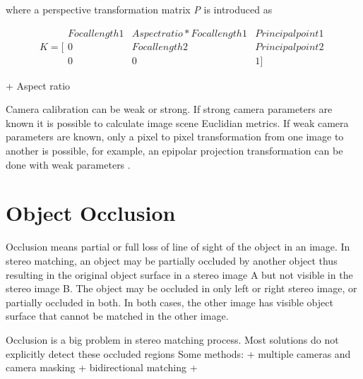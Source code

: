 \documentclass[12pt,a4paper,oneside,pdftex]{report}
\begin{document}
where a perspective transformation matrix \emph{P} is introduced as



\begin{equation} K =
\Biggl[ \begin{array}{ccc}
Focal length 1 & Aspect ratio * Focal length 1 & Principal point 1 \\
0 & Focal length 2 & Principal point 2 \\
0 & 0 & 1 \Biggl] \end{array}
\end{equation}

+ Aspect ratio


Camera calibration can be weak or strong. If strong camera parameters are known it is possible to calculate image scene Euclidian metrics. If weak camera parameters are known, only a pixel to pixel transformation from one image to another is possible, for example, an epipolar projection transformation can be done with weak parameters \cite{Rander97}.


\section{Object Occlusion}

Occlusion means partial or full loss of line of sight of the object in an image. In stereo matching, an object may be partially occluded by another object thus resulting in the original object surface in a stereo image A but not visible in the stereo image B. The object may be occluded in only left or right stereo image, or partially occluded in both. In both cases, the other image has visible object surface that cannot be matched in the other image.

Occlusion is a big problem in stereo matching process. Most solutions do not explicitly detect these occluded regions 
Some methods:
+ multiple cameras and camera masking
+ bidirectional matching
+ 
\end{document}
